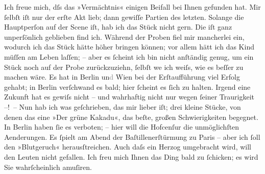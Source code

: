 \pstart
           Ich freue mich, dſs das »Vermächtnis« einigen
               Beifall bei Ihnen gefunden hat. Mir ſelbſt iſt nur der erſte Akt lieb; dann gewiſſe
               Partien des letzten. Solange die Hauptperſon auf der Scene iſt, hab ich das Stück
               nicht gern. Die iſt ganz unperſönlich geblieben find ich. Während der Proben fiel mir
               mancherlei ein, wodurch ich das Stück hätte höher bringen können; vor allem hätt ich
               das Kind {\pb}müſſen am Leben laſſen; – aber es
               ſcheint ich bin nicht anſtändig genug, um ein Stück noch auf der Probe zurückzuziehn,
               ſelbſt we{\geminationn} ich weiſs, wie es beſſer zu machen wäre. Es
               hat in Berlin un\textcolor{gray}{d}{ }Wien bei der Erſtaufführung viel Erfolg gehabt; in
                  Berlin verſchwand es bald; hier ſcheint es
               ſich zu halten. Irgend eine Zukunft hat es gewiſs nicht – und wahrhaftig nicht nur
               wegen ſeiner Traurigkeit –! – Nun hab ich was geſchrieben, das mir lieber iſt; drei
               kleine Stücke, von denen das {\pb}eine »Der grüne Kakadu«, das beſte, großen
               Schwierigkeiten begegnet. In Berlin haben ſie es
               verboten; – hier will die Hofcenſur die unmöglichſten Aenderungen. Es ſpielt am Abend
               der Baſtillenerſtürmung zu Paris – aber ich ſoll den »Blutgeruch« herausſtreichen. Auch
               daſs ein Herzog umgebracht wird, will den Leuten nicht gefallen. Ich freu mich Ihnen
               das Ding bald zu ſchicken; es wird Sie wahrſcheinlich amuſiren.\pend
           

